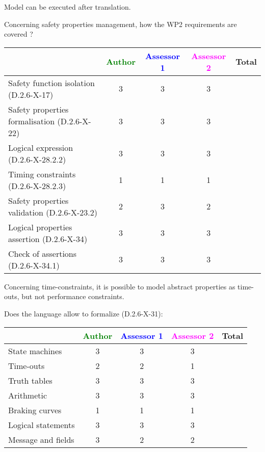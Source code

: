 \begin{author_comment}
Model can be executed after translation.
\end{author_comment}

Concerning safety properties management, how the WP2 requirements are covered ?

\begin{tabular}{|l | c | c | c | c|}
\hline
& \textcolor{green}{Author} & \textcolor{blue}{Assessor 1} & \textcolor{magenta}{Assessor 2} & Total \\
\hline 
Safety function isolation (D.2.6-X-17)  & 3 & 3 & 3 &  \\
\hline 
Safety properties formalisation (D.2.6-X-22)  & 3 & 3 & 3 &  \\
\hline
Logical expression (D.2.6-X-28.2.2)  & 3 & 3 & 3 &  \\
\hline
Timing constraints (D.2.6-X-28.2.3)  & 1 & 1 & 1 &  \\
\hline
Safety properties validation (D.2.6-X-23.2)  & 2 & 3 & 2 &  \\
\hline
Logical properties assertion (D.2.6-X-34)  & 3 & 3 & 3 &  \\
\hline
Check  of assertions (D.2.6-X-34.1)  & 3 & 3 & 3 &  \\
\hline
\end{tabular}


\begin{author_comment}
Concerning time-constraints, it is possible to  model  abstract properties as time-outs, but not performance constraints.
\end{author_comment}


Does the language allow to  formalize (D.2.6-X-31):

\begin{tabular}{|l | c | c | c | c|}
\hline
& \textcolor{green}{Author} & \textcolor{blue}{Assessor 1} & \textcolor{magenta}{Assessor 2} & Total \\
\hline 
State machines  & 3 & 3 & 3 &  \\
\hline
Time-outs  & 2 & 2 & 1 &  \\
\hline
Truth tables  & 3 & 3 & 3 &  \\
\hline
Arithmetic  & 3 & 3 & 3 &  \\
\hline
Braking curves  & 1 & 1 & 1 &  \\
\hline
Logical statements & 3 & 3 & 3 &  \\
\hline
Message and fields & 3 & 2 & 2 &  \\
\hline
\end{tabular}

